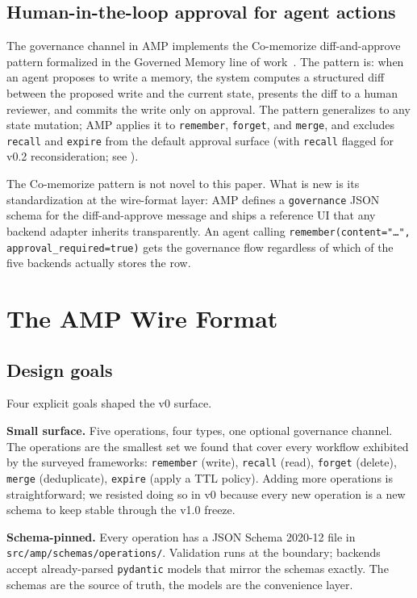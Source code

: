 \documentclass[11pt,letterpaper,twocolumn]{article}
\begin{document}
\subsection{Human-in-the-loop approval for agent actions}

The governance channel in AMP implements the Co-memorize diff-and-approve pattern formalized in the Governed Memory line of work~\cite{taheri2026governed}. The pattern is: when an agent proposes to write a memory, the system computes a structured diff between the proposed write and the current state, presents the diff to a human reviewer, and commits the write only on approval. The pattern generalizes to any state mutation; AMP applies it to \texttt{remember}, \texttt{forget}, and \texttt{merge}, and excludes \texttt{recall} and \texttt{expire} from the default approval surface (with \texttt{recall} flagged for v0.2 reconsideration; see ).

The Co-memorize pattern is not novel to this paper. What is new is its standardization at the wire-format layer: AMP defines a \texttt{governance} JSON schema for the diff-and-approve message and ships a reference UI that any backend adapter inherits transparently. An agent calling \texttt{remember(content="\ldots", approval\_required=true)} gets the governance flow regardless of which of the five backends actually stores the row.

\section{The AMP Wire Format}
\label{sec:spec}

\subsection{Design goals}
\label{sec:spec-goals}

Four explicit goals shaped the v0 surface.

\textbf{Small surface.} Five operations, four types, one optional governance channel. The operations are the smallest set we found that cover every workflow exhibited by the surveyed frameworks: \texttt{remember} (write), \texttt{recall} (read), \texttt{forget} (delete), \texttt{merge} (deduplicate), \texttt{expire} (apply a TTL policy). Adding more operations is straightforward; we resisted doing so in v0 because every new operation is a new schema to keep stable through the v1.0 freeze.

\textbf{Schema-pinned.} Every operation has a JSON Schema 2020-12 file in \texttt{src/amp/schemas/operations/}. Validation runs at the boundary; backends accept already-parsed \texttt{pydantic} models that mirror the schemas exactly. The schemas are the source of truth, the models are the convenience layer.
\end{document}
